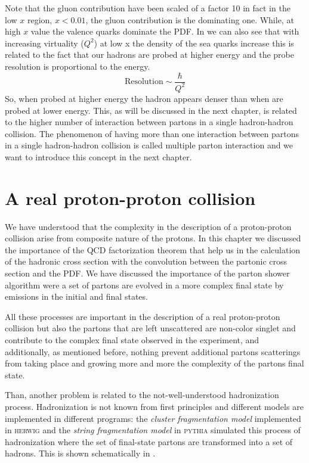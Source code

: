 Note that the gluon contribution have been scaled of a factor 10 in fact in the low $x$ region, $x<0.01$, the gluon contribution is the dominating one. While, at high $x$ value the valence quarks dominate the PDF. In  we can also see that with increasing virtuality ($Q^2$) at low x the density of the sea quarks increase this is related to the fact that our hadrons are probed at higher energy and the probe resolution is proportional to the energy. 
\begin{equation}
	\text{Resolution}\sim\frac{\hbar}{Q^2}
\end{equation}
So, when probed at higher energy the hadron appears denser than when are probed at lower energy. This, as will be discussed in the next chapter, is related to the higher number of interaction between partons in a single hadron-hadron collision. The phenomenon of having more than one interaction between partons in a single hadron-hadron collision is called multiple parton interaction and we want to introduce this concept in the next chapter.


\section{A real proton-proton collision}

We have understood that the complexity in the description of a proton-proton collision arise from composite nature of the protons. In this chapter we discussed the importance of the QCD factorization theorem that help us in the calculation of the hadronic cross section with the convolution between the partonic cross section and the PDF. We have discussed the importance of the parton shower algorithm were a set of partons are evolved in a more complex final state by emissions in the initial and final states.

All these processes are important in the description of a real proton-proton collision but also the partons that are left unscattered are non-color singlet and contribute to the complex final state observed in the experiment, and additionally, as mentioned before, nothing prevent additional partons scatterings from taking place and growing more and more the complexity of the partons final state. 

Than, another problem is related to the not-well-understood hadronization process.
Hadronization is not known from first principles and different models are implemented in different programs: the \textit{cluster fragmentation model} implemented in \textsc{herwig} and the \textit{string fragmentation model} in \textsc{pythia} simulated this process of hadronization where the set of final-state partons are transformed into a set of hadrons.
This is shown schematically in .

